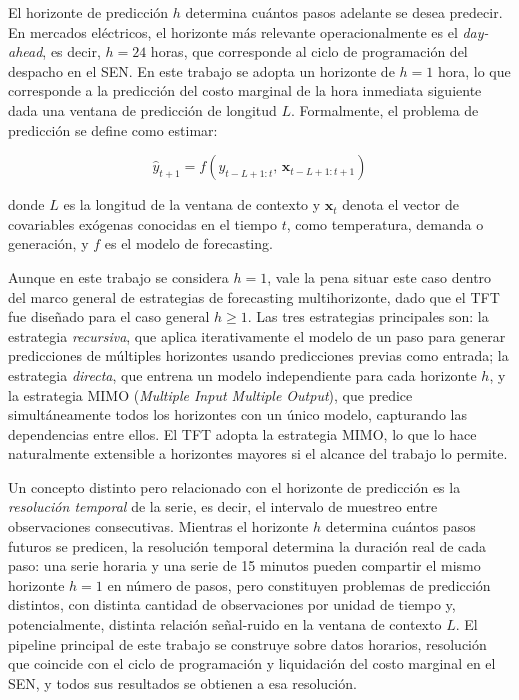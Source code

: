 El horizonte de predicción $h$ determina cuántos pasos adelante se desea predecir. En mercados eléctricos, el horizonte más relevante operacionalmente es el \textit{day-ahead}, es decir, $h=24$ horas, que corresponde al ciclo de programación del despacho en el SEN. En este trabajo se adopta un horizonte de $h=1$ hora, lo que corresponde a la predicción del costo marginal de la hora inmediata siguiente dada una ventana de predicción de longitud $L$. Formalmente, el problema de predicción se define como estimar:

\begin{equation}
    \hat{y}_{t+1} = f\left(y_{t-L+1:t},\, \mathbf{x}_{t-L+1:t+1}\right)
\end{equation}

donde $L$ es la longitud de la ventana de contexto y $\mathbf{x}_t$ denota el vector de covariables exógenas conocidas en el tiempo $t$, como temperatura, demanda o generación, y $f$ es el modelo de forecasting.

Aunque en este trabajo se considera $h=1$, vale la pena situar este caso dentro del marco general de estrategias de forecasting multihorizonte, dado que el TFT fue diseñado para el caso general $h \geq 1$. Las tres estrategias principales son: la estrategia \textit{recursiva}, que aplica iterativamente el modelo de un paso para generar predicciones de múltiples horizontes usando predicciones previas como entrada; la estrategia \textit{directa}, que entrena un modelo independiente para cada horizonte $h$, y la estrategia MIMO (\textit{Multiple Input Multiple Output}), que predice simultáneamente todos los horizontes con un único modelo, capturando las dependencias entre ellos. El TFT adopta la estrategia MIMO, lo que lo hace naturalmente extensible a horizontes mayores si el alcance del trabajo lo permite.

Un concepto distinto pero relacionado con el horizonte de predicción es la \textit{resolución temporal} de la serie, es decir, el intervalo de muestreo entre observaciones consecutivas. Mientras el horizonte $h$ determina cuántos pasos futuros se predicen, la resolución temporal determina la duración real de cada paso: una serie horaria y una serie de 15 minutos pueden compartir el mismo horizonte $h=1$ en número de pasos, pero constituyen problemas de predicción distintos, con distinta cantidad de observaciones por unidad de tiempo y, potencialmente, distinta relación señal-ruido en la ventana de contexto $L$. El pipeline principal de este trabajo se construye sobre datos horarios, resolución que coincide con el ciclo de programación y liquidación del costo marginal en el SEN, y todos sus resultados se obtienen a esa resolución.


